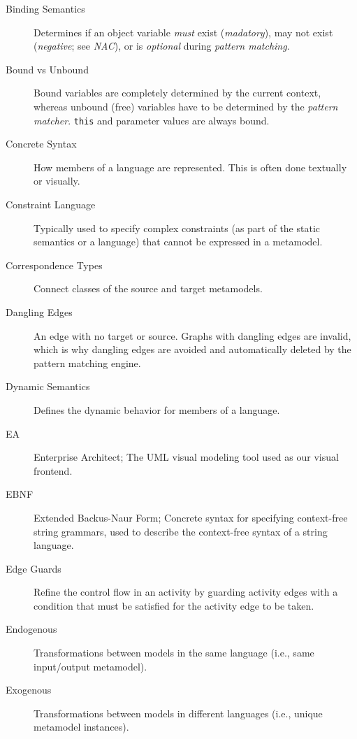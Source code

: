 \begin{description}
\item[Binding Semantics] %
Determines if an object variable \emph{must} exist (\emph{madatory}), may not exist (\emph{negative}; see \emph{NAC}), or is \emph{optional} during
\emph{pattern matching}.

\item[Bound vs Unbound] %
Bound variables are completely determined by the current context, whereas unbound (free) variables have to be determined by the \emph{pattern matcher}.
\texttt{this} and parameter values are always bound.

\item[Concrete Syntax] %
How members of a language are represented. This is often done textually or visually.

\item[Constraint Language] %
Typically used to specify complex constraints (as part of the static semantics or a language) that cannot be expressed in a metamodel.

\item[Correspondence Types] %
Connect classes of the source and target metamodels.

\item[Dangling Edges] %
An edge with no target or source. Graphs with dangling edges are invalid, which is why dangling edges are avoided and automatically deleted by the pattern
matching engine.

\item[Dynamic Semantics] %
Defines the dynamic behavior for members of a language.

\item[EA] %
Enterprise Architect; The UML visual modeling tool used as our visual frontend.

\item[EBNF] %
Extended Backus-Naur Form; Concrete syntax for specifying context-free string grammars, used to describe the context-free syntax of a string
language.

\item[Edge Guards] %
Refine the control flow in an activity by guarding activity edges with a condition that must be satisfied for the activity edge to be taken.

\item[Endogenous] %
Transformations between models in the same language (i.e., same input/output metamodel). 
 
\item[Exogenous] %
Transformations between models in different languages (i.e., unique metamodel instances). 


\end{description}
